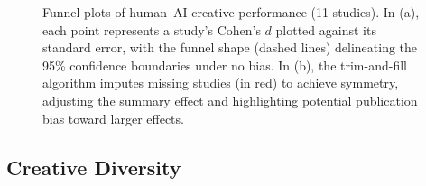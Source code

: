 \documentclass[acmsmall,authorversion]{acmart}
\begin{document}
\begin{figure}[H]
\begin{subfigure}[b]{0.49\linewidth}
  \end{subfigure}
  \caption{Funnel plots of human–AI creative performance (11 studies). In (a), each point represents a study’s Cohen’s $d$ plotted against its standard error, with the funnel shape (dashed lines) delineating the 95\% confidence boundaries under no bias. In (b), the trim-and-fill algorithm imputes missing studies (in red) to achieve symmetry, adjusting the summary effect and highlighting potential publication bias toward larger effects.}
  \label{fig:performance_funnels}
\end{figure}


\subsection{Creative Diversity}
\end{document}
